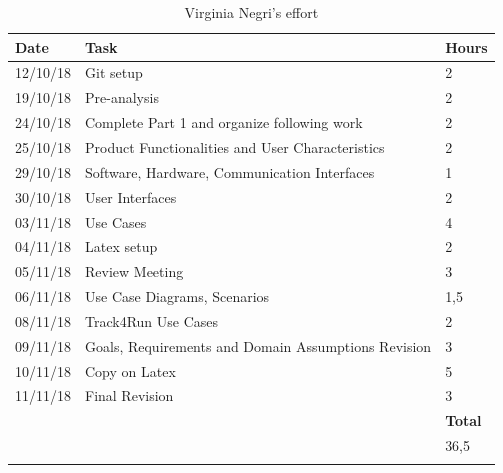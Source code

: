 \documentclass[titlepage]{article}
\begin{document}
	\begin{longtable}{| p{2 cm} | p{5 cm} | p{2 cm} |} 
			\hline
			{\bf Date} & {\bf Task} & {\bf Hours}\\
			\hline
			 12/10/18 & Git setup & 2 \\
			19/10/18 & Pre-analysis & 2 \\
			24/10/18 & Complete Part 1 and organize following work & 2 \\
			25/10/18 & Product Functionalities and User Characteristics& 2 \\
			29/10/18 & Software, Hardware, Communication Interfaces & 1 \\
			30/10/18 & User Interfaces & 2 \\
			03/11/18 & Use Cases & 4 \\
			04/11/18 & Latex setup & 2 \\
			05/11/18 & Review Meeting & 3 \\
			06/11/18 & Use Case Diagrams, Scenarios & 1,5\\
			08/11/18 & Track4Run Use Cases & 2 \\
			09/11/18 & Goals, Requirements and Domain Assumptions Revision & 3 \\
			10/11/18 & Copy on Latex & 5 \\
			11/11/18 & Final Revision & 3 \\
			\hline
			 & & {\bf Total} \\
			 \hline
			  & & 36,5 \\
			  \hline
			\caption{Virginia Negri's effort}
			\end{longtable}

	
\end{document}
